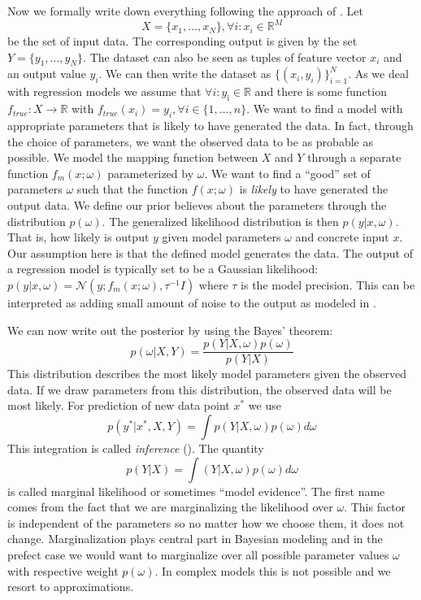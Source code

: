\documentclass[12pt,a4paper,twoside]{scrartcl}
\numberwithin{equation}{section}
\begin{document}
Now we formally write down everything following the approach of \cite{gal2016}. Let
\begin{equation}
  X = \{x_1,\ldots , x_N\}, \forall i : x_i\in\mathbb{R}^M
\end{equation}
be the set of input data. The corresponding output is given by the set \(Y = \{y_1,\ldots , y_N\}\). The dataset can also be seen as tuples of feature vector \(x_i\) and an output value \(y_i\). We can then write the dataset as \(\{ (x_i,y_i)\}_{i=1}^N \). As we deal with regression models we assume that \(\forall i : y_{\text{i}}\in \mathbb{R}\) and there is some function \(f_{true}:X \rightarrow\mathbb{R}\) with \(f_{true}(x_i)=y_i, \forall i \in\{1,\ldots , n\}\). We want to find a model with appropriate parameters that is likely to have generated the data. In fact, through the choice of parameters, we want the observed data to be as probable as possible. We model the mapping function between \(X\) and \(Y\) through a separate function \(f_m(x; \omega)\) parameterized by \(\omega\). We want to find a ``good'' set of parameters \(\omega\) such that the function \(f(x;\omega)\) is \emph{likely} to have generated the output data. We define our prior believes about the parameters through the distribution \(p(\omega )\). The generalized likelihood distribution is then \(p(y|x, \omega)\). That is, how likely is output \(y\) given model parameters \(\omega\) and concrete input \(x\). Our assumption here is that the defined model generates the data. The output of a regression model is typically set to be a Gaussian likelihood: \(p(y|x,\omega)=\mathcal{N}(y; f_m(x;\omega), \tau^{-1}I)\) where \(\tau\) is the model precision. This can be interpreted as adding small amount of noise to the output as modeled in \cite{gal2016}.

We can now write out the posterior by using the Bayes' theorem:
\begin{equation}
  p(\omega|X,Y) = \frac{p(Y|X, \omega)p(\omega)}{p(Y|X)}
\end{equation}
This distribution describes the most likely model parameters given the observed data. If we draw parameters from this distribution, the observed data will be most likely. For prediction of new data point \(x^*\) we use
\begin{equation}
  p(y^{\text{*}}|x^{\text{*}},X,Y) = \displaystyle\int p(Y|X, \omega)p(\omega)d \omega
\end{equation}
This integration is called \emph{inference} (\cite{gal2016}). The quantity
\begin{equation}
  p(Y|X) = \displaystyle\int (Y|X, \omega)p( \omega )d \omega
\end{equation}
is called marginal likelihood or sometimes ``model evidence''. The first name comes from the fact that we are marginalizing the likelihood over \(\omega\). This factor is independent of the parameters so no matter how we choose them, it does not change. Marginalization plays central part in Bayesian modeling and in the prefect case we would want to marginalize over all possible parameter values \(\omega\) with respective weight \(p(\omega)\). In complex models this is not possible and we resort to approximations.
\end{document}
